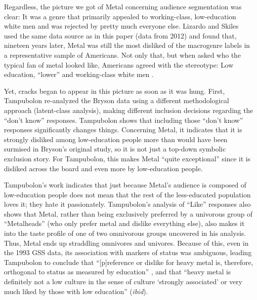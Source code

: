 \documentclass[a4paper,12pt]{extarticle}
\begin{document}
Regardless, the picture we got of Metal concerning audience segmentation was clear: It was a genre that primarily appealed to working-class, low-education white men and was rejected by pretty much everyone else. Lizardo and Skiles \citeyearpar[][6, table 2]{lizardo_skiles16} used the same data source as in this paper (data from 2012) and found that, nineteen years later, Metal was still the most disliked of the macrogenre labels in a representative sample of Americans. Not only that, but when asked who the typical fan of metal looked like, Americans agreed with the stereotype: Low education, ``lower'' and working-class white men \citep[][7, table 3]{lizardo_skiles16}. 

Yet, cracks began to appear in this picture as soon as it was hung. First, Tampubolon \citeyearpar{tampubolon2008revisiting} re-analyzed the Bryson data using a different methodological approach (latent-class analysis), making different inclusion decisions regarding the ``don't know'' responses. Tampubolon shows that including those ``don't know'' responses significantly changes things. Concerning Metal, it indicates that it is strongly disliked among low-education people more than would have been surmised in Bryson's original study, so it is not just a top-down symbolic exclusion story. For Tampubolon, this makes Metal ``quite exceptional'' since it is disliked across the board and even more by low-education people. 

Tampubolon's work indicates that just because Metal's audience is composed of low-education people does not mean that the rest of the less-educated population loves it; they hate it passionately. Tampubolon's analysis of ``Like'' responses also shows that Metal, rather than being exclusively preferred by a univorous group of ``Metalheads'' (who only prefer metal and dislike everything else), also makes it into the taste profile of one of two omnivorous groups uncovered in his analysis. Thus, Metal ends up straddling omnivores and univores. Because of this, even in the 1993 GSS data, its association with markers of status was ambiguous, leading Tampubolon to conclude that ``[p]reference or dislike for heavy metal is, therefore, orthogonal to status as measured by education'' \citeyearpar[][257]{tampubolon2008revisiting}, and that ``heavy metal is definitely not a low culture in the sense of culture `strongly associated' or very much liked by those with low education'' (\textit{ibid}).
\end{document}
